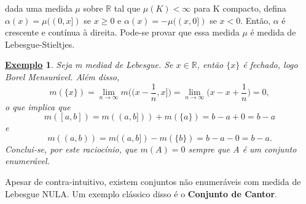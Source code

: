 \documentclass{article}
\newtheorem{example}{\underline{Exemplo}}
\begin{document}
dada uma medida \(\mu \) sobre \(\mathbb{R}\) tal que \(\mu (K) < \infty\) para K compacto, defina \(\alpha (x) = \mu ((0, x])\) se \(x \geq 0\) e \(\alpha (x) = -\mu ((x, 0])\) se \(x < 0\). Então,
\(\alpha \) é crescente e contínua à direita. Pode-se provar que essa medida \(\mu \) é medida de Lebesgue-Stieltjes.
\begin{example}
	Seja m mediad de Lebesgue. Se \(x\in \mathbb{R}\), então \(\{x\}\) é fechado, logo Borel Mensurável. Além disso,
	\[
		m(\{x\}) = \lim_{n\to \infty}m \biggl(\biggl(x - \frac{1}{n}, x\biggr]\biggr) = \lim_{n\to \infty}\biggl(x - x + \frac{1}{n}\biggr) = 0,
	\]
	o que implica que
	\[
		m([a, b]) = m((a, b])) + m(\{a\}) = b-a + 0 = b-a
	\]
	e
	\[
		m((a, b)) = m((a, b]) - m(\{b\}) = b-a - 0 = b-a.
	\]
	Conclui-se, por este raciocínio, que \(m(A) = 0\) sempre que A é um conjunto enumerável.
\end{example}
Apesar de contra-intuitivo, existem conjuntos não enumeráveis com medida de Lebesgue NULA. Um exemplo clássico disso é o \textbf{Conjunto de Cantor}.
\end{document}
